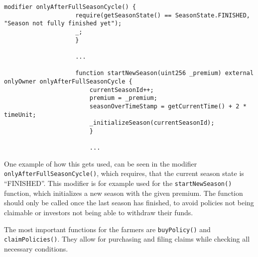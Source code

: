 \documentclass[11pt,a4paper]{article}
\begin{document}
\begin{lstlisting}[style=soliditystyle, caption={RainyDayFund.sol - Main Insurance Contract},label={lst:lstlisting1}]
				modifier onlyAfterFullSeasonCycle() {
					require(getSeasonState() == SeasonState.FINISHED, "Season not fully finished yet");
					_;
					}

					...

					function startNewSeason(uint256 _premium) external onlyOwner onlyAfterFullSeasonCycle {
						currentSeasonId++;
						premium = _premium;
						seasonOverTimeStamp = getCurrentTime() + 2 * timeUnit;
						_initializeSeason(currentSeasonId);
						}

						...
		\end{lstlisting}

		One example of how this gets used, can be seen in the modifier \texttt{onlyAfterFullSeasonCycle()}, which requires, that the current season state is \enquote{FINISHED}.
		This modifier is for example used for the \texttt{startNewSeason()} function, which initializes a new season with the given premium.
		The function should only be called once the last season has finished, to avoid policies not being claimable or investors not being able to withdraw their funds.

		The most important functions for the farmers are \texttt{buyPolicy()} and \texttt{claimPolicies()}.
		They allow for purchasing and filing claims while checking all necessary conditions.
\end{document}
